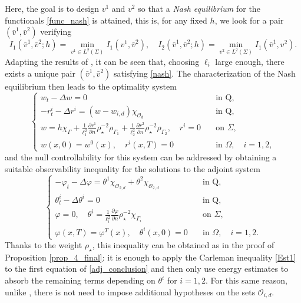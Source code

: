 \documentclass{dcds-bOF}
\theoremstyle{definition}
\def\cbd{\Gamma}
\begin{document}
\begin{enumerate}
Here, the goal is to design $v^1$ and $v^2$ so that a \textit{Nash equilibrium} for the functionals \eqref{func_nash} is attained, this is,  for any fixed $h$, we look for a pair $(\bar v^1,\bar v^2)$ verifying
%
\begin{equation}\label{nash}
I_1(\bar v^1,\bar v^2;h)=\min_{v^1\in L^2(\Sigma)}I_1(v^1,\bar v^2), \quad I_2(\bar v^1,\bar v^2;h)=\min_{v^2\in L^2(\Sigma)}I_1(\bar v^1, v^2).
\end{equation}
%
Adapting the results of \cite{araruna,vhs_corri}, it can be seen that, choosing $\ell_i$ large enough, there exists a unique pair $(\bar v^1,\bar v^2)$ satisfying \eqref{nash}. The characterization of the Nash equilibrium then leads to the optimality system
%
\begin{equation*}%
\begin{cases}
w_t-\Delta w=0 &\quad  \text{in Q}, \\
-r^{i}_t-\Delta r^{i}= (w-w_{i,d})\chi_{\mathcal O_d}  &\quad  \text{in Q},\\
w=h\chi_{\cbd}+ \frac{1}{\ell_1^2}\frac{\partial r^{1}}{\partial n}\rho_\star^{-2}\rho_{\Gamma_1}+\frac{1}{\ell_2^2}\frac{\partial r^{2}}{\partial n}\rho_\star^{-2}\rho_{ \Gamma_2}, \quad r^{i}=0 &\quad \text{on } \Sigma, \\
w(x,0)=w^0(x),\quad r^{i}(x,T)=0 &\quad \text{in } \Omega, \quad i=1,2,
\end{cases}
\end{equation*}
%
and the null controllability for this system can be addressed by obtaining a suitable observability inequality for the solutions to the adjoint system
%
\begin{equation}\label{adj_conclusion}
\begin{cases}
-\varphi_t-\Delta \varphi=\theta^1\chi_{\mathcal O_{2,d}}+\theta^2\chi_{\mathcal O_{2,d}} &\quad  \text{in Q}, \\
\theta^{i}_t-\Delta \theta^{i}= 0 &\quad  \text{in Q},\\
\varphi=0, \quad \theta^{i}=\frac{1}{\ell_i^2}\frac{\partial \varphi}{\partial n}\rho_\star^{-2}\chi_{\Gamma_i} &\quad \text{on } \Sigma, \\
\varphi(x,T)=\varphi^T(x),\quad \theta^{i}(x,0)=0 &\quad \text{in } \Omega, \quad i=1,2.
\end{cases}
\end{equation}
%
Thanks to the weight $\rho_\star$, this inequality can be obtained as in the proof of Proposition \ref{prop_4_final}: it is enough to apply the Carleman inequality \eqref{Est1} to the first equation of \eqref{adj_conclusion} and then only use energy estimates to absorb the remaining terms depending on $\theta^{i}$ for $i=1,2$. For this same reason, unlike \cite{araruna,vhs_corri}, there is not need to impose additional hypotheses on the sets $\mathcal O_{i,d}$.


\end{enumerate}
\end{document}
